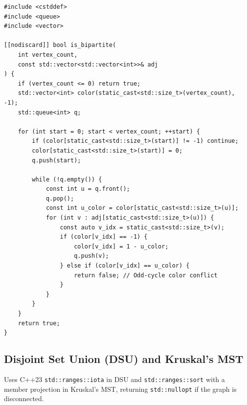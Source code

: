 \documentclass[11pt,a4paper]{article}
\theoremstyle{definition}
\begin{document}
\begin{lstlisting}[caption={Bipartite graph verification via multi-component BFS 2-coloring}]
#include <cstddef>
#include <queue>
#include <vector>

[[nodiscard]] bool is_bipartite(
    int vertex_count,
    const std::vector<std::vector<int>>& adj
) {
    if (vertex_count <= 0) return true;
    std::vector<int> color(static_cast<std::size_t>(vertex_count), -1);
    std::queue<int> q;

    for (int start = 0; start < vertex_count; ++start) {
        if (color[static_cast<std::size_t>(start)] != -1) continue;
        color[static_cast<std::size_t>(start)] = 0;
        q.push(start);

        while (!q.empty()) {
            const int u = q.front();
            q.pop();
            const int u_color = color[static_cast<std::size_t>(u)];
            for (int v : adj[static_cast<std::size_t>(u)]) {
                const auto v_idx = static_cast<std::size_t>(v);
                if (color[v_idx] == -1) {
                    color[v_idx] = 1 - u_color;
                    q.push(v);
                } else if (color[v_idx] == u_color) {
                    return false; // Odd-cycle color conflict
                }
            }
        }
    }
    return true;
}
\end{lstlisting}

\subsection{Disjoint Set Union (DSU) and Kruskal's MST}
Uses C++23 \texttt{std::ranges::iota} in DSU and \texttt{std::ranges::sort} with a member projection in Kruskal's MST, returning \texttt{std::nullopt} if the graph is disconnected.
\end{document}
